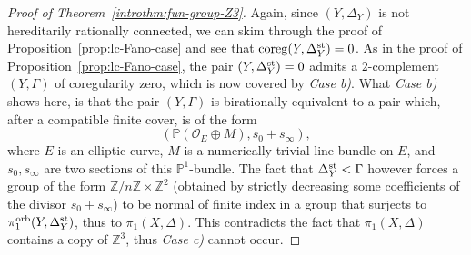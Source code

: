 \documentclass{amsart}
\newcommand{\pp}{\mathbb{P}}
\newcommand{\zz}{\mathbb{Z}}
\theoremstyle{definition}
\theoremstyle{remark}
\numberwithin{equation}{section}
\begin{document}
\begin{proof}[Proof of Theorem~\ref{introthm:fun-group-Z3}]
Again, since $(Y,\Delta_Y)$ is not hereditarily rationally connected, we can skim through the proof of Proposition~\ref{prop:lc-Fano-case} and see that ${\rm coreg}(Y,\Delta_{Y}^{\rm st})=0$. As in the proof of Proposition~\ref{prop:lc-Fano-case}, the pair $(Y,\Delta_{Y}^{\rm st})=0$ admits a $2$-complement $(Y,\Gamma)$ of coregularity zero, which is now covered by {\it Case b)}. What {\it Case b)} shows here, is that the pair $(Y,\Gamma)$ is birationally equivalent to a pair which, after a compatible finite cover, is of the form
$$(\mathbb{P}(\mathcal{O}_E\oplus M),s_0+s_{\infty}),$$ 
where $E$ is an elliptic curve, $M$ is a numerically trivial line bundle on $E$, and $s_0,s_{\infty}$ are two sections of this $\pp^1$-bundle.
The fact that $\Delta_Y^{\rm st} <\Gamma$ however forces a group of the form
$\zz/n\zz\times \zz^2$ (obtained by strictly decreasing some coefficients of the divisor $s_0+s_{\infty}$) to be normal of finite index in a group that surjects to $\pi_1^{\rm orb}(Y,\Delta_Y^{\rm st})$, thus to $\pi_1(X,\Delta)$. This contradicts the fact that $\pi_1(X,\Delta)$ contains a copy of $\zz^3$, thus {\it Case c)} cannot occur.
\end{proof}
\end{document}
